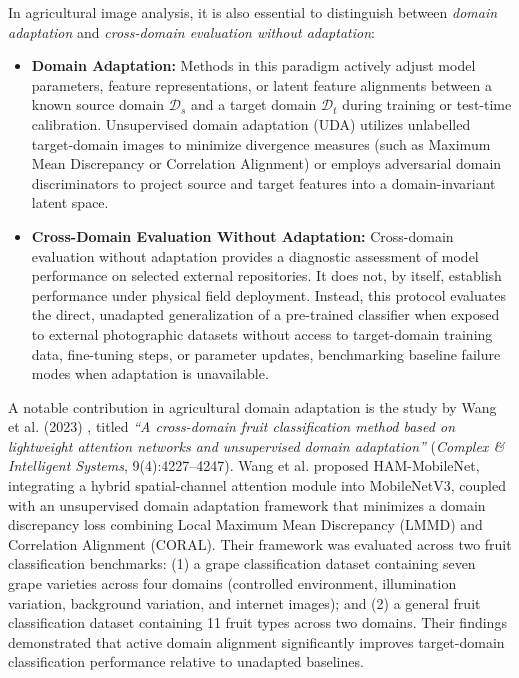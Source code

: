 In agricultural image analysis, it is also essential to distinguish between \textit{domain adaptation} and \textit{cross-domain evaluation without adaptation}:
\begin{itemize}
\item \textbf{Domain Adaptation:} Methods in this paradigm actively adjust model parameters, feature representations, or latent feature alignments between a known source domain $\mathcal{D}_s$ and a target domain $\mathcal{D}_t$ during training or test-time calibration. Unsupervised domain adaptation (UDA) utilizes unlabelled target-domain images to minimize divergence measures (such as Maximum Mean Discrepancy or Correlation Alignment) or employs adversarial domain discriminators to project source and target features into a domain-invariant latent space.
\item \textbf{Cross-Domain Evaluation Without Adaptation:} Cross-domain evaluation without adaptation provides a diagnostic assessment of model performance on selected external repositories. It does not, by itself, establish performance under physical field deployment. Instead, this protocol evaluates the direct, unadapted generalization of a pre-trained classifier when exposed to external photographic datasets without access to target-domain training data, fine-tuning steps, or parameter updates, benchmarking baseline failure modes when adaptation is unavailable.
\end{itemize}

A notable contribution in agricultural domain adaptation is the study by Wang et al. (2023) \cite{wang2023crossdomain}, titled \textit{``A cross-domain fruit classification method based on lightweight attention networks and unsupervised domain adaptation''} (\textit{Complex \& Intelligent Systems}, 9(4):4227--4247). Wang et al. proposed HAM-MobileNet, integrating a hybrid spatial-channel attention module into MobileNetV3, coupled with an unsupervised domain adaptation framework that minimizes a domain discrepancy loss combining Local Maximum Mean Discrepancy (LMMD) and Correlation Alignment (CORAL). Their framework was evaluated across two fruit classification benchmarks: (1) a grape classification dataset containing seven grape varieties across four domains (controlled environment, illumination variation, background variation, and internet images); and (2) a general fruit classification dataset containing 11 fruit types across two domains. Their findings demonstrated that active domain alignment significantly improves target-domain classification performance relative to unadapted baselines.

